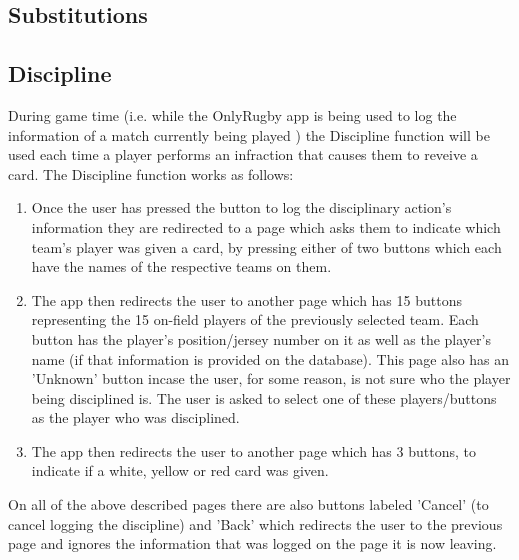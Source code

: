 \documentclass[hidelinks,a4paper,12pt]{article}
\begin{document}
	\subsection{Substitutions}
	
	\subsection{Discipline}
		During game time (i.e. while the OnlyRugby app is being used to log the information of a match currently being played ) the Discipline function will be used each time a player performs an infraction that causes them to reveive a card. The Discipline function works as follows:
		\begin{enumerate}
			\item Once the user has pressed the button to log the disciplinary action's information they are redirected to a page which asks them to indicate which team's player was given a card, by pressing either of two buttons which each have the names of the respective teams on them.
			\item The app then redirects the user to another page which has 15 buttons representing the 15 on-field players of the previously selected team. Each button has the player's position/jersey number on it as well as the player's name (if that information is provided on the database). This page also has an 'Unknown' button incase the user, for some reason, is not sure who the player being disciplined is. The user is asked to select one of these players/buttons as the player who was disciplined.
			\item The app then redirects the user to another page which has 3 buttons, to indicate if a white, yellow or red card was given.
		\end{enumerate}
	On all of the above described pages there are also buttons labeled 'Cancel' (to cancel logging the discipline) and 'Back' which redirects the user to the previous page and ignores the information that was logged on the page it is now leaving.
\end{document}
